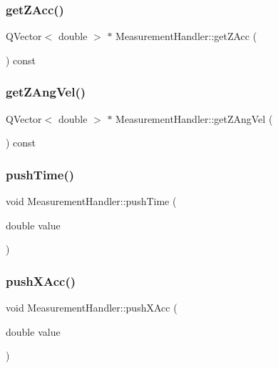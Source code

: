 \mbox{\label{class_measurement_handler_aa9429cbbd110d64168635e9325dcf487}} 
\subsubsection{get\+Z\+Acc()}
{\footnotesize\ttfamily Q\+Vector$<$ double $>$ $\ast$ Measurement\+Handler\+::get\+Z\+Acc (\begin{DoxyParamCaption}{ }\end{DoxyParamCaption}) const}

\mbox{\label{class_measurement_handler_a89631c6b8b3ba7c1aab620bdcf595896}} 
\subsubsection{get\+Z\+Ang\+Vel()}
{\footnotesize\ttfamily Q\+Vector$<$ double $>$ $\ast$ Measurement\+Handler\+::get\+Z\+Ang\+Vel (\begin{DoxyParamCaption}{ }\end{DoxyParamCaption}) const}

\mbox{\label{class_measurement_handler_a95dad9123275dbb03f9cd01852e82df5}} 
\subsubsection{push\+Time()}
{\footnotesize\ttfamily void Measurement\+Handler\+::push\+Time (\begin{DoxyParamCaption}\item[{double}]{value }\end{DoxyParamCaption})}

\mbox{\label{class_measurement_handler_a73435da23551d54e3db30467a0d7d82a}} 
\subsubsection{push\+X\+Acc()}
{\footnotesize\ttfamily void Measurement\+Handler\+::push\+X\+Acc (\begin{DoxyParamCaption}\item[{double}]{value }\end{DoxyParamCaption})}

